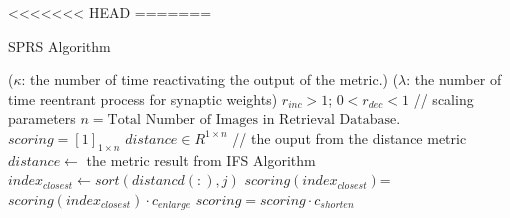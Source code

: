 \documentclass[letterpaper]{article}
\begin{document}
<<<<<<< HEAD
%        
=======
\begin{algorithm}[h]
\begin{small}
 \caption{SPRS Algorithm}
 \begin{algorithmic}[1] 
 	\State ($\kappa$: the number of time reactivating the output of the metric.) 
 	\State ($\lambda$: the number of time reentrant process for synaptic weights)	
 	\State $r_{inc}>1$;  $0 < r_{dec} < 1$ // scaling parameters 	 	
	\State $n = \mbox{Total Number of Images in Retrieval Database.}$   
	\State $scoring =[1]_{1 \times n}$
	\State $distance \in  R^{1 \times n}$ // the ouput from the distance metric
   \State $distance \leftarrow$ the metric result from IFS Algorithm
   	 		\State $index_{closest} \leftarrow sort(distancd(:), j)$
   	 		\State $scoring(index_{closest})$=$scoring(index_{closest}) \cdot c_{enlarge}$    	 	      		
    	\EndFor
        \State $scoring = scoring \cdot c_{shorten}$
        
   \EndFor 
 \end{algorithmic}
 \end{small}
\end{algorithm}
\end{document}
